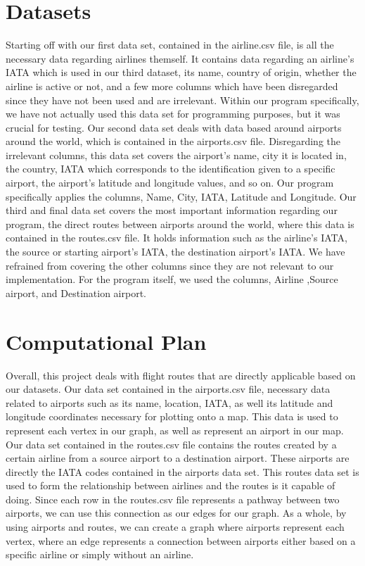 \documentclass[fontsize=11pt]{article}
\begin{document}
\section*{Datasets}
Starting off with our first data set, contained in the airline.csv file, is all the necessary data regarding airlines themself. It contains data regarding an airline’s IATA which is used in our third dataset, its name, country of origin, whether the airline is active or not, and a few more columns which have been disregarded since they have not been used and are irrelevant. Within our program specifically, we have not actually used this data set for programming purposes, but it was crucial for testing. Our second data set deals with data based around airports around the world, which is contained in the airports.csv file. Disregarding the irrelevant columns, this data set covers the airport’s name, city it is located in, the country, IATA which corresponds to the identification given to a specific airport, the airport’s latitude and longitude values, and so on. Our program specifically applies the columns, Name, City, IATA, Latitude and Longitude. Our third and final data set covers the most important information regarding our program, the direct routes between airports around the world, where this data is contained in the routes.csv file. It holds information such as the airline’s IATA, the source or starting airport’s IATA, the destination airport’s IATA. We have refrained from covering the other columns since they are not relevant to our implementation. For the program itself, we used the columns, Airline ,Source airport, and Destination airport. \\


\section*{Computational Plan}

Overall, this project deals with flight routes that are directly applicable based on our datasets. Our data set contained in the airports.csv file, necessary data related to airports such as its name, location, IATA, as well its latitude and longitude coordinates necessary for plotting onto a map. This data is used to represent each vertex in our graph, as well as represent an airport in our map. Our data set contained in the routes.csv file contains the routes created by a certain airline from a source airport to a destination airport. These airports are directly the IATA codes contained in the airports data set. This routes data set is used to form the relationship between airlines and the routes is it capable of doing. Since each row in the routes.csv file represents a pathway between two airports, we can use this connection as our edges for our graph. As a whole, by using airports and routes, we can create a graph where airports represent each vertex, where an edge represents a connection between airports either based on a specific airline or simply without an airline. \\
\end{document}
